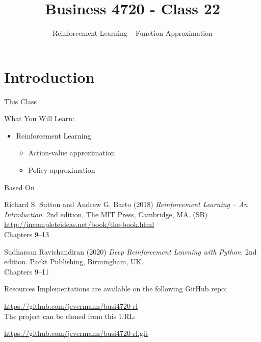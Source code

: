 \documentclass[ignorenonframetext,xcolor=x11names]{beamer}
\title{Business 4720 - Class 22}
\subtitle{Reinforcement Learning -- Function Approximation}
\begin{document}
\begin{frame}{}
  \titlepage
  \footnotesize
  
\end{frame}

\section{Introduction}

\begin{frame}{This Class}

\begin{block}{What You Will Learn:}
\begin{itemize}
  \item Reinforcement Learning
  \begin{itemize}
     \item Action-value approximation
     \item Policy approximation
  \end{itemize}
\end{itemize}
\end{block}
\end{frame}

\begin{frame}{Based On}
\begin{block}{}
Richard S. Sutton and Andrew G. Barto (2018) \emph{Reinforcement Learning -- An Introduction}. 2nd edition, The MIT Press, Cambridge, MA. (SB) \\
\vspace{0.5\baselineskip}
\url{http://incompleteideas.net/book/the-book.html} \\
\vspace{0.5\baselineskip}
Chapters 9--13
\end{block}

\begin{block}{}
Sudharsan Ravichandiran (2020) \emph{Deep Reinforcement Learning with Python}. 2nd edition. Packt Publishing, Birmingham, UK. \\
\vspace{0.5\baselineskip}
Chapters 9--11
\end{block}

\end{frame}

\begin{frame}{Resources}
Implementations are available on the following GitHub repo:

\url{https://github.com/jevermann/busi4720-rl} \\


The project can be cloned from this URL:

\url{https://github.com/jevermann/busi4720-rl.git}
\end{frame}
\end{document}
